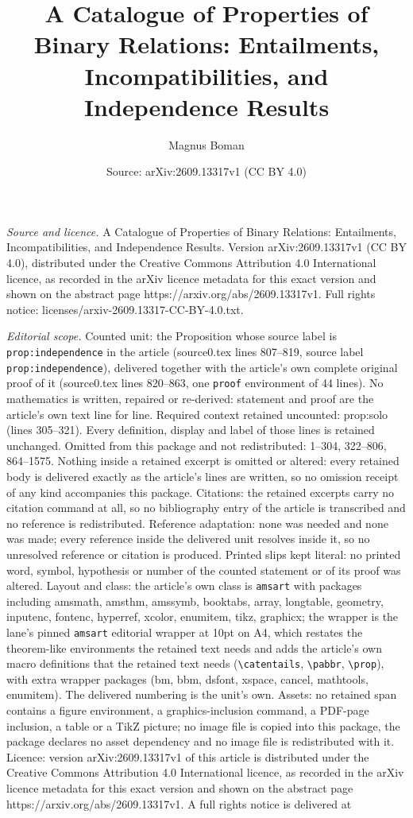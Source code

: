\documentclass[10pt,a4paper]{amsart}
\title[A Catalogue of Properties of Binary Relations: Entailments, ]{A Catalogue of Properties of Binary Relations: Entailments, Incompatibilities, and Independence Results}
\author{Magnus Boman}
\date{Source: arXiv:2609.13317v1 (CC BY 4.0)}
\begin{document}
\maketitle

\noindent\emph{Source and licence.} A Catalogue of Properties of Binary Relations: Entailments, Incompatibilities, and Independence Results. Version arXiv:2609.13317v1 (CC BY 4.0), distributed under the Creative Commons Attribution 4.0 International licence, as recorded in the arXiv licence metadata for this exact version and shown on the abstract page https://arxiv.org/abs/2609.13317v1. Full rights notice: licenses/arxiv-2609.13317-CC-BY-4.0.txt.\par\smallskip

\noindent\textit{Editorial scope.} Counted unit: the Proposition whose source label is \texttt{prop:independence} in the article (source0.tex lines 807--819, source label \texttt{prop:independence}), delivered together with the article's own complete original proof of it (source0.tex lines 820--863, one \texttt{proof} environment of 44 lines). No mathematics is written, repaired or re-derived: statement and proof are the article's own text line for line. Required context retained uncounted: prop:solo (lines 305--321). Every definition, display and label of those lines is retained unchanged. Omitted from this package and not redistributed: 1--304, 322--806, 864--1575. Nothing inside a retained excerpt is omitted or altered: every retained body is delivered exactly as the article's lines are written, so no omission receipt of any kind accompanies this package. Citations: the retained excerpts carry no citation command at all, so no bibliography entry of the article is transcribed and no reference is redistributed. Reference adaptation: none was needed and none was made; every reference inside the delivered unit resolves inside it, so no unresolved reference or citation is produced. Printed slips kept literal: no printed word, symbol, hypothesis or number of the counted statement or of its proof was altered. Layout and class: the article's own class is \texttt{amsart} with packages including amsmath, amsthm, amssymb, booktabs, array, longtable, geometry, inputenc, fontenc, hyperref, xcolor, enumitem, tikz, graphicx; the wrapper is the lane's pinned \texttt{amsart} editorial wrapper at 10pt on A4, which restates the theorem-like environments the retained text needs and adds the article's own macro definitions that the retained text needs (\texttt{\textbackslash catentails}, \texttt{\textbackslash pabbr}, \texttt{\textbackslash prop}), with extra wrapper packages (bm, bbm, dsfont, xspace, cancel, mathtools, enumitem). The delivered numbering is the unit's own. Assets: no retained span contains a figure environment, a graphics-inclusion command, a PDF-page inclusion, a table or a TikZ picture; no image file is copied into this package, the package declares no asset dependency and no image file is redistributed with it. Licence: version arXiv:2609.13317v1 of this article is distributed under the Creative Commons Attribution 4.0 International licence, as recorded in the arXiv licence metadata for this exact version and shown on the abstract page https://arxiv.org/abs/2609.13317v1. A full rights notice is delivered at 
\end{document}
